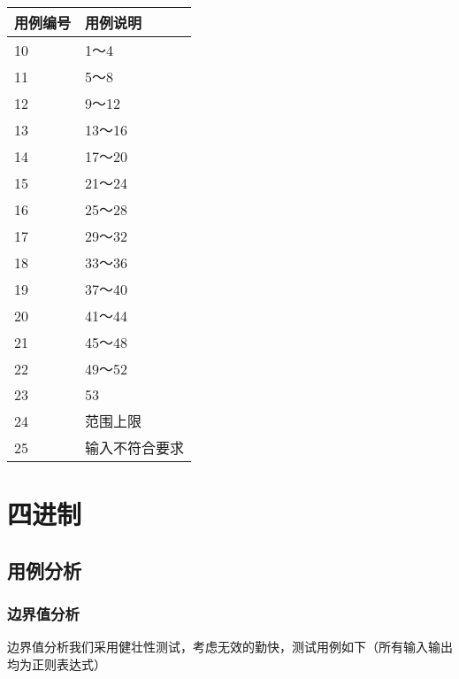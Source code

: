 \documentclass[12pt, a4paper, oneside]{ctexart}
\begin{document}
\newpage
\begin{table}[!h]
    \begin{tabular}{|l|l|}
    \hline
    用例编号 & 用例说明\\ \hline
    10 & 1～4\\ \hline
    11 & 5～8 \\ \hline
    12 & 9～12 \\ \hline
    13 & 13～16 \\ \hline
    14 & 17～20 \\ \hline
    15 & 21～24 \\ \hline
    16 & 25～28 \\ \hline
    17 & 29～32  \\ \hline
    18 & 33～36 \\ \hline
    19 & 37～40 \\ \hline
    20 & 41～44 \\ \hline
    21 & 45～48 \\ \hline
    22 & 49～52 \\ \hline
    23 & 53 \\ \hline
    24 & 范围上限 \\ \hline
    25 & 输入不符合要求 \\ \hline

    \end{tabular}
\end{table}





\section{四进制}

\subsection{用例分析}

\subsubsection{边界值分析}
边界值分析我们采用健壮性测试，考虑无效的勤快，测试用例如下（所有输入输出均为正则表达式）
\end{document}
